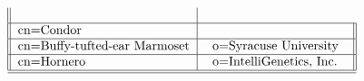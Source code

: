 \begin{table}
\[\begin{tabular}{||l|l||}
\begin{tabular}{l}
           \end{tabular}\\ \hline
cn=Condor
           &\begin{tabular}{l}
           \end{tabular}\\ \hline
cn=Buffy-tufted-ear Marmoset
           &\begin{tabular}{l}
           o=Syracuse University \\
           \end{tabular}\\ \hline
cn=Hornero
           &\begin{tabular}{l}
           o=IntelliGenetics, Inc. \\
           \end{tabular}\\ \hline
\hline
\end{tabular}
\]
\end{table}

